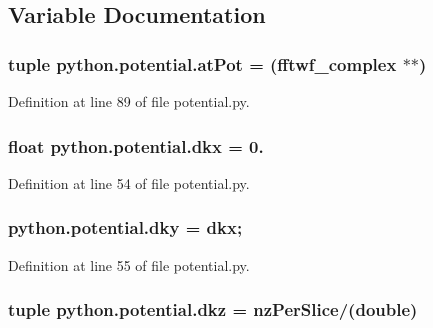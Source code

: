 \subsection{Variable Documentation}
\hypertarget{namespacepython_1_1potential_a7cbd16891d7c557b696ed26450863b2a}{
\subsubsection[{at\-Pot}]{\setlength{\rightskip}{0pt plus 5cm}tuple python.\-potential.\-at\-Pot = (fftwf\-\_\-complex $\ast$$\ast$)}}\label{namespacepython_1_1potential_a7cbd16891d7c557b696ed26450863b2a}


Definition at line 89 of file potential.\-py.

\hypertarget{namespacepython_1_1potential_a1d2b0aac7f793fa41f05885ee0890f7f}{
\subsubsection[{dkx}]{\setlength{\rightskip}{0pt plus 5cm}float python.\-potential.\-dkx = 0.}}\label{namespacepython_1_1potential_a1d2b0aac7f793fa41f05885ee0890f7f}


Definition at line 54 of file potential.\-py.

\hypertarget{namespacepython_1_1potential_a2e7a9b5a9efe5c210899832341141003}{
\subsubsection[{dky}]{\setlength{\rightskip}{0pt plus 5cm}python.\-potential.\-dky = {\bf dkx};}}\label{namespacepython_1_1potential_a2e7a9b5a9efe5c210899832341141003}


Definition at line 55 of file potential.\-py.

\hypertarget{namespacepython_1_1potential_a09e49990bf7cc3d23dbdc26da239142e}{
\subsubsection[{dkz}]{\setlength{\rightskip}{0pt plus 5cm}tuple python.\-potential.\-dkz = {\bf nz\-Per\-Slice}/(double)}}\label{namespacepython_1_1potential_a09e49990bf7cc3d23dbdc26da239142e}


